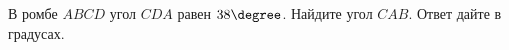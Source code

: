 \begin{ex}
	\begin{condition}
		 В ромбе \( ABCD \) угол \( CDA \) равен \( 38\degree \). Найдите угол \( CAB \). Ответ дайте в градусах.
	\end{condition}
\end{ex}
